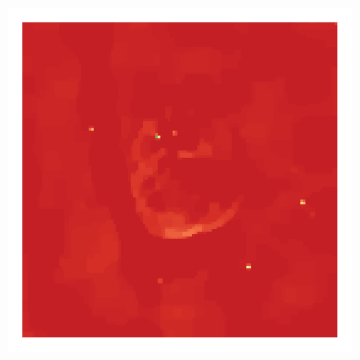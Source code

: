 \begin{figure}[h]
\begin{subfigure}[b]{0.3\linewidth}
	\end{subfigure}
	\begin{subfigure}[b]{0.3\linewidth}
		\includegraphics[width=\linewidth, trim={18px 19px 18px 18px}, clip]{./chapters/05.results/g55/TV_model.png}
	\end{subfigure}
	

\end{figure}
